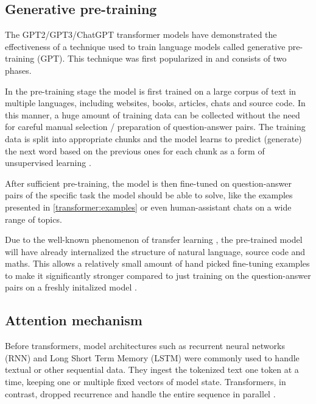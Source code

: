 \subsection{Generative pre-training}

The GPT2/GPT3/ChatGPT transformer models have demonstrated the effectiveness of a technique used to train language models called generative pre-training (GPT). This technique was first popularized in \cite{improvinglu} and consists of two phases.

In the pre-training stage the model is first trained on a large corpus of text in multiple languages, including websites, books, articles, chats and source code. In this manner, a huge amount of training data can be collected without the need for careful manual selection / preparation of question-answer pairs. The training data is split into appropriate chunks and the model learns to predict (generate) the next word based on the previous ones for each chunk as a form of unsupervised learning .

After sufficient pre-training, the model is then fine-tuned on question-answer pairs of the specific task the model should be able to solve, like the examples presented in \cref{transformer:examples} or even human-assistant chats on a wide range of topics.

Due to the well-known phenomenon of transfer learning \cite{transferlearning}, the pre-trained model will have already internalized the structure of natural language, source code and maths. 
This allows a relatively small amount of hand picked fine-tuning examples to make it significantly stronger compared to just training on the question-answer pairs on a freshly initalized model .

\subsection{Attention mechanism}

Before transformers, model architectures such as recurrent neural networks (RNN) and Long Short Term Memory (LSTM) were commonly used to handle textual or other sequential data. They ingest the tokenized text one token at a time, keeping one or multiple fixed vectors of model state. Transformers, in contrast, dropped recurrence and handle the entire sequence in parallel .

